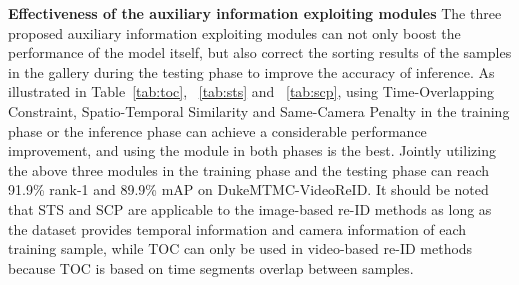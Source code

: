 \documentclass[10pt,twocolumn,letterpaper]{article}
\begin{document}
\begin{table}[]
\begin{threeparttable}
\begin{center}
\caption{Ablation studies on Dynamic Training Iterations. We compare the performance of fixed iterations and dynamic iterations in which the training iteration coefficient is set to 0.6.}
\label{tab:tricks-iter}
\end{center}
\end{threeparttable}
\end{table}

\noindent \textbf{Effectiveness of the auxiliary information exploiting modules}
The three proposed auxiliary information exploiting modules can not only boost the performance of the model itself, but also correct the sorting results of the samples in the gallery during the testing phase to improve the accuracy of inference. As illustrated in Table~\ref{tab:toc}, ~\ref{tab:sts} and ~\ref{tab:scp}, using Time-Overlapping Constraint, Spatio-Temporal Similarity and Same-Camera Penalty in the training phase or the inference phase can achieve a considerable performance improvement, and using the module in both phases is the best. Jointly utilizing the above three modules in the training phase and the testing phase can reach 91.9\% rank-1 and 89.9\% mAP on DukeMTMC-VideoReID. It should be noted that STS and SCP are applicable to the image-based re-ID methods as long as the dataset provides temporal information and camera information of each training sample, while TOC can only be used in video-based re-ID methods because TOC is based on time segments overlap between samples.
\end{document}
